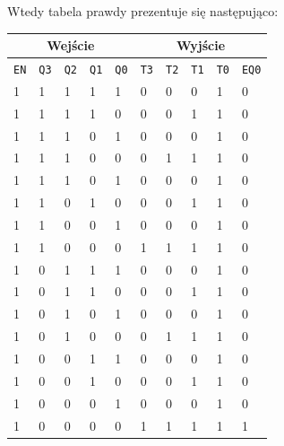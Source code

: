 \documentclass[a4paper]{article}
\begin{document}
    Wtedy tabela prawdy prezentuje się następująco:
        \begin{center}
            \begin{tabular}{|l|l|l|l|l||l|l|l|l|l|}
            \hline
            \multicolumn{5}{|c||}{Wejście} & \multicolumn{5}{|c|}{Wyjście} \\\hline
            \verb|EN| &\verb|Q3| & \verb|Q2| & \verb|Q1| & \verb|Q0| & \verb|T3| & \verb|T2| & \verb|T1| & \verb|T0| & \verb|EQ0| \\ \hline
            1 & 1 & 1 & 1 & 1 & 0 & 0 & 0 & 1 & 0 \\ \hline
            1 & 1 & 1 & 1 & 0 & 0 & 0 & 1 & 1 & 0 \\ \hline
            1 & 1 & 1 & 0 & 1 & 0 & 0 & 0 & 1 & 0 \\ \hline
            1 & 1 & 1 & 0 & 0 & 0 & 1 & 1 & 1 & 0 \\ \hline
            1 & 1 & 1 & 0 & 1 & 0 & 0 & 0 & 1 & 0 \\ \hline
            1 & 1 & 0 & 1 & 0 & 0 & 0 & 1 & 1 & 0 \\ \hline
            1 & 1 & 0 & 0 & 1 & 0 & 0 & 0 & 1 & 0 \\ \hline
            1 & 1 & 0 & 0 & 0 & 1 & 1 & 1 & 1 & 0 \\ \hline
            1 & 0 & 1 & 1 & 1 & 0 & 0 & 0 & 1 & 0 \\ \hline
            1 & 0 & 1 & 1 & 0 & 0 & 0 & 1 & 1 & 0 \\ \hline
            1 & 0 & 1 & 0 & 1 & 0 & 0 & 0 & 1 & 0 \\ \hline
            1 & 0 & 1 & 0 & 0 & 0 & 1 & 1 & 1 & 0 \\ \hline
            1 & 0 & 0 & 1 & 1 & 0 & 0 & 0 & 1 & 0 \\ \hline
            1 & 0 & 0 & 1 & 0 & 0 & 0 & 1 & 1 & 0 \\ \hline
            1 & 0 & 0 & 0 & 1 & 0 & 0 & 0 & 1 & 0 \\ \hline
            1 & 0 & 0 & 0 & 0 & 1 & 1 & 1 & 1 & 1 \\ \hline


\end{tabular}
\end{center}
\end{document}
